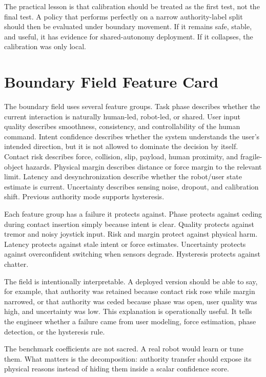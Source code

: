 \documentclass{article}
\begin{document}
The practical lesson is that calibration should be treated as the first test, not the final test. A policy that performs perfectly on a narrow authority-label split should then be evaluated under boundary movement. If it remains safe, stable, and useful, it has evidence for shared-autonomy deployment. If it collapses, the calibration was only local.

\clearpage
\section{Boundary Field Feature Card}

The boundary field uses several feature groups. Task phase describes whether the current interaction is naturally human-led, robot-led, or shared. User input quality describes smoothness, consistency, and controllability of the human command. Intent confidence describes whether the system understands the user's intended direction, but it is not allowed to dominate the decision by itself. Contact risk describes force, collision, slip, payload, human proximity, and fragile-object hazards. Physical margin describes distance or force margin to the relevant limit. Latency and desynchronization describe whether the robot/user state estimate is current. Uncertainty describes sensing noise, dropout, and calibration shift. Previous authority mode supports hysteresis.

Each feature group has a failure it protects against. Phase protects against ceding during contact insertion simply because intent is clear. Quality protects against tremor and noisy joystick input. Risk and margin protect against physical harm. Latency protects against stale intent or force estimates. Uncertainty protects against overconfident switching when sensors degrade. Hysteresis protects against chatter.

The field is intentionally interpretable. A deployed version should be able to say, for example, that authority was retained because contact risk rose while margin narrowed, or that authority was ceded because phase was open, user quality was high, and uncertainty was low. This explanation is operationally useful. It tells the engineer whether a failure came from user modeling, force estimation, phase detection, or the hysteresis rule.

The benchmark coefficients are not sacred. A real robot would learn or tune them. What matters is the decomposition: authority transfer should expose its physical reasons instead of hiding them inside a scalar confidence score.
\end{document}
